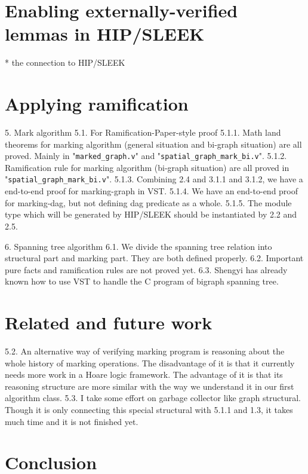 \documentclass[pldi]{sigplanconf-pldi15}
\begin{document}


\section{Enabling externally-verified lemmas in HIP/SLEEK}

* the connection to HIP/SLEEK

\section{Applying ramification}

5. Mark algorithm
5.1. For Ramification-Paper-style proof
5.1.1. Math land theorems for marking algorithm (general situation and bi-graph situation) are all proved. Mainly in "\texttt{marked\_graph.v}" and "\texttt{spatial\_graph\_mark\_bi.v}".
5.1.2. Ramification rule for marking algorithm (bi-graph situation) are all proved in "\texttt{spatial\_graph\_mark\_bi.v}".
5.1.3. Combining 2.4 and 3.1.1 and 3.1.2, we have a end-to-end proof for marking-graph in VST.
5.1.4. We have an end-to-end proof for marking-dag, but not defining dag predicate as a whole.
5.1.5. The module type which will be generated by HIP/SLEEK should be instantiated by 2.2 and 2.5.

6. Spanning tree algorithm
6.1. We divide the spanning tree relation into structural part and marking part. They are both defined properly.
6.2. Important pure facts and ramification rules are not proved yet.
6.3. Shengyi has already known how to use VST to handle the C program of bigraph spanning tree.

\section{Related and future work}

5.2. An alternative way of verifying marking program is reasoning about the whole history of marking operations. The disadvantage of it is that it currently needs more work in a Hoare logic framework. The advantage of it is that its reasoning structure are more similar with the way we understand it in our first algorithm class.
5.3. I take some effort on garbage collector like graph structural. Though it is only connecting this special structural with 5.1.1 and 1.3, it takes much time and it is not finished yet.

\section{Conclusion}



\end{document}
